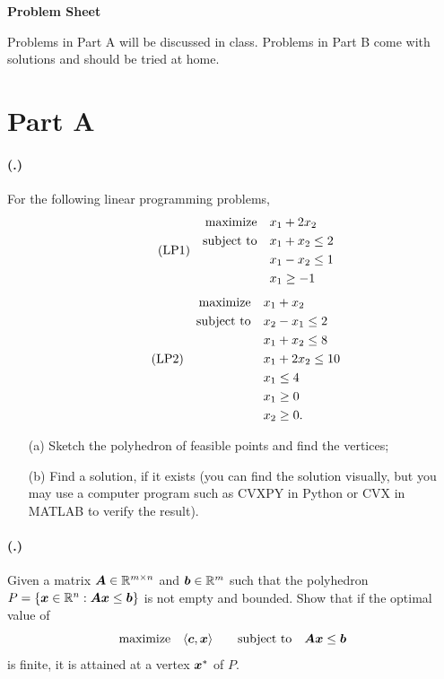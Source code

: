 \documentclass{article}
\newcounter{problemSheetNumber}
\newcounter{problems}
\renewcommand{\problem}{\paragraph{(\theproblemSheetNumber.\theproblems)}\addtocounter{problems}{1}}
\begin{document}
 
\begin{center}
{\Large {\bf Problem Sheet \theproblemSheetNumber}}
\end{center}

Problems in Part A will be discussed in class.
Problems in Part B come with solutions and should be tried at home. 

\section*{Part A}

\problem For the following linear programming problems,
\begin{align}\label{eq:ex1}\tag{LP1}
\begin{split}
 \text{maximize}\quad & x_1+2x_2 \\
 \quad\text{subject to}\quad &x_1+x_2\leq 2\\
 & x_1-x_2\leq 1\\
 &x_1\geq -1
\end{split}
\end{align}
\begin{align}\label{eq:ex1}\tag{LP2}
\begin{split}
 \text{maximize}\quad & x_1+x_2 \\
 \quad\text{subject to}\quad
 & x_2-x_1\leq 2\\
 & x_1+x_2\leq 8\\
 &x_1+2x_2\leq 10\\
 &x_1\leq 4\\
 &x_1\geq 0\\
 &x_2\geq 0.
\end{split}
\end{align}

\begin{itemize}
 \item[(a)] Sketch the polyhedron of feasible points and find the vertices;
 \item[(b)] Find a solution, if it exists (you can find the solution visually, but you may use a computer program such as CVXPY in Python or CVX in MATLAB to verify the result).
\end{itemize}

\problem Given a matrix $\bm{A}\in \mathbb{R}^{m\times n}$ and $\bm{b}\in \mathbb{R}^m$ such that the polyhedron $P=\{\bm{x}\in \mathbb{R}^n\mathrel{\mathop{:}} \bm{A}\bm{x}\leq \bm{b}\}$ is not empty and bounded. 
Show that if the optimal value of
\begin{equation*}
 \text{maximize}\quad \langle {\bm{c}}, {\bm{x}} \rangle \quad \quad\text{subject to}\quad \bm{A}\bm{x}\leq \bm{b}
\end{equation*}
is finite, it is attained at a vertex $\bm{x}^*$ of $P$. 
\end{document}
